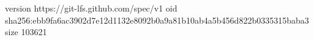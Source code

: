 version https://git-lfs.github.com/spec/v1
oid sha256:ebb9fa6ac3902d7e12d1132e8092b0a9a81b10ab4a5b456d822b0335315baba3
size 103621
